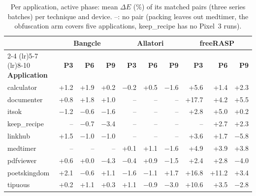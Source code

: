\begin{table}[t]
\centering
\small
\caption{Per application, active phase: mean $\Delta E$ (\%) of its matched pairs (three series batches) per technique and device. –: no pair (packing leaves out medtimer, the obfuscation arm covers five applications, keep\_recipe has no Pixel~3 runs).}
\label{tab:per-app-active}
\begin{tabular}{lrrrrrrrrr}
\toprule
 & \multicolumn{3}{c}{\textbf{Bangcle}} & \multicolumn{3}{c}{\textbf{Allatori}} & \multicolumn{3}{c}{\textbf{freeRASP}} \\
\cmidrule(lr){2-4} \cmidrule(lr){5-7} \cmidrule(lr){8-10}
\textbf{Application} & \textbf{P3} & \textbf{P6} & \textbf{P9} & \textbf{P3} & \textbf{P6} & \textbf{P9} & \textbf{P3} & \textbf{P6} & \textbf{P9} \\
\midrule
calculator & +1.2 & +1.9 & +0.2 & $-$0.2 & +0.5 & $-$1.6 & +5.6 & +1.4 & +2.3 \\
documenter & +0.8 & +1.8 & +1.0 & – & – & – & +17.7 & +4.2 & +5.5 \\
itsok & $-$1.2 & $-$0.6 & $-$1.6 & – & – & – & +2.8 & +5.0 & +0.2 \\
keep\_recipe & – & $-$0.7 & $-$3.4 & – & – & – & – & +2.7 & +2.3 \\
linkhub & +1.5 & $-$1.0 & $-$1.0 & – & – & – & +3.6 & +1.7 & $-$5.8 \\
medtimer & – & – & – & +0.1 & +1.1 & $-$1.6 & +4.9 & +3.9 & +3.8 \\
pdfviewer & +0.6 & +0.0 & $-$4.3 & $-$0.4 & +0.9 & $-$1.5 & +2.4 & +2.8 & $-$4.0 \\
poetskingdom & +2.1 & $-$0.6 & +1.1 & $-$1.6 & $-$1.1 & +1.7 & +16.8 & +11.2 & +3.4 \\
tipuous & +0.2 & +1.1 & +0.3 & +1.1 & $-$0.9 & $-$3.0 & +10.6 & +3.5 & $-$2.8 \\
\bottomrule
\end{tabular}
\end{table}
